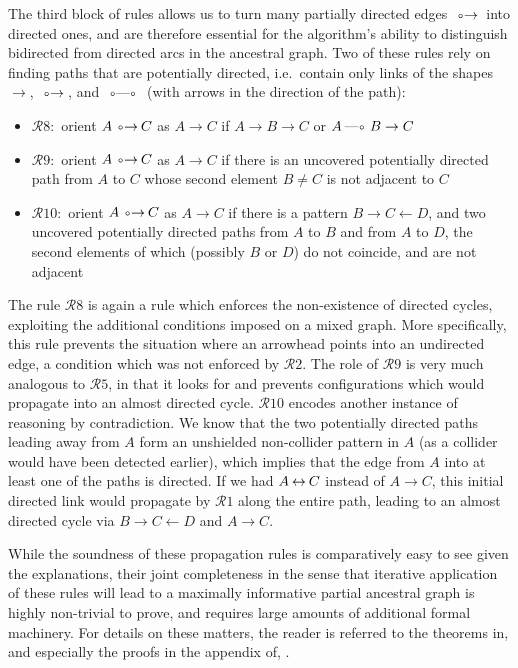 The third block of rules allows us to turn many partially directed edges $\arrowOA$ into
directed ones, and are therefore essential for the algorithm's ability to distinguish
bidirected from directed arcs in the ancestral graph. Two of these rules rely on finding
paths that are potentially directed, i.e.\ contain only links of the shapes
$\rightarrow$, $\arrowOA$, and $\arrowOO$ (with arrows in the direction of the path):
\begin{itemize}
 \item $\mathcal{R}8:$ orient $A \arrowOA C$ as $A \rightarrow C$ if $A \rightarrow B \rightarrow C$
 or $A \arrowLO B \rightarrow C$
 \item $\mathcal{R}9:$ orient $A \arrowOA C$ as $A \rightarrow C$ if there is an
 uncovered potentially directed path from $A$ to $C$ whose second element $B \neq C$ is not adjacent to $C$
 \item $\mathcal{R}10:$ orient $A \arrowOA C$ as $A \rightarrow C$ if there is a pattern $B \rightarrow C \leftarrow D$,
 and two uncovered potentially directed paths from $A$ to $B$ and from $A$ to $D$, the second elements of which
 (possibly $B$ or $D$) do not coincide, and are not adjacent
\end{itemize}
The rule $\mathcal{R}8$ is again a rule which enforces the non-existence of directed cycles, exploiting the additional conditions imposed on a mixed graph. More specifically, this rule prevents the situation where an arrowhead points into an undirected edge, a condition which was not enforced by $\mathcal{R}2$. The role of $\mathcal{R}9$ is very much analogous to $\mathcal{R}5$, in that it looks for and prevents configurations which would propagate into an almost directed cycle. $\mathcal{R}10$ encodes another instance of reasoning by contradiction. We know that the two potentially directed paths leading away from $A$ form an unshielded non-collider pattern in $A$ (as a collider would have been detected earlier), which implies that the edge from $A$ into at least one of the paths is directed. If we had $A \arrowAA C$ instead of $A \rightarrow C$, this initial directed link would propagate by $\mathcal{R}1$ along the entire path, leading to an almost directed cycle via $B \rightarrow C \leftarrow D$ and $A \rightarrow C$.

\largerpage[-1]
While the soundness of these propagation rules is comparatively easy to see given the explanations, their joint completeness in the sense that iterative application of these rules will lead to a maximally informative partial ancestral graph is highly non-trivial to prove, and requires large amounts of additional formal machinery. For details on these matters, the reader is referred to the theorems in, and especially the proofs in the appendix of, \cite{zhang2008}.

